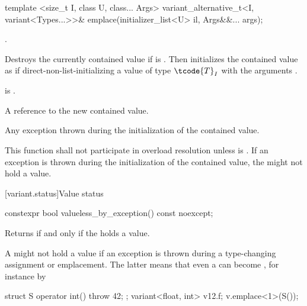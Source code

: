 %
\begin{itemdecl}
template <size_t I, class U, class... Args>
  variant_alternative_t<I, variant<Types...>>& emplace(initializer_list<U> il, Args&&... args);
\end{itemdecl}

\begin{itemdescr}
\pnum
\requires
{}.

\pnum
\effects
Destroys the currently contained value if 
is .
Then initializes the contained value as if direct-non-list-initializing
a value of type $\tcode{T}_I$
with the arguments .

\pnum
\postconditions
{} is .

\pnum
\returns
A reference to the new contained value.

\pnum
\throws
Any exception thrown during the initialization of the contained value.

\pnum
\remarks
This function shall not participate in overload resolution unless
 is .
If an exception is thrown during the initialization of the contained value,
the  might not hold a value.
\end{itemdescr}

[variant.status]{Value status}

%
\begin{itemdecl}
constexpr bool valueless_by_exception() const noexcept;
\end{itemdecl}

\begin{itemdescr}
\pnum
\effects
Returns  if and only if the  holds a value.

\pnum
\begin{note}
A  might not hold a value if an exception is thrown during a
type-changing assignment or emplacement. The latter means that even a
 can become , for
instance by
\begin{codeblock}
struct S { operator int() { throw 42; }};
variant<float, int> v{12.f};
v.emplace<1>(S());
\end{codeblock}
\end{note}
\end{itemdescr}

